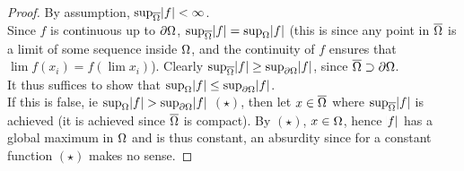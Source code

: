 \begin{proof}
By assumption, $\sup_{\overline{\Omega}} \abs{f} < \infty$.\\

Since $f$ is continuous up to $\partial \Omega$, $\sup_{\overline{\Omega}} \abs{f} = \sup_{\Omega} \abs{f}$ (this is since any point in $\overline{\Omega}$ is a limit of some sequence inside $\Omega$, and the continuity of $f$ ensures that $\lim f(x_i) = f(\lim x_i)$). Clearly $\sup_{\overline{\Omega}} \abs{f} \geq \sup_{\partial \Omega} \abs{f}$, since $\overline{\Omega} \supset \partial \Omega$.\\

It thus suffices to show that $\sup_{\Omega} \abs{f} \leq \sup_{\partial \Omega} \abs{f}$.\\

If this is false, ie $ \sup_{\Omega} \abs{f} > \sup_{\partial \Omega} \abs{f}$ $(\star)$, then let $x \in \overline{\Omega}$ where $\sup_{\overline{ \Omega}} \abs{f} $ is achieved (it is achieved since $\overline{\Omega}$ is compact). By $(\star)$, $x \in \Omega$, hence $\abs{f}$ has a global maximum in $\Omega$ and is thus constant, an absurdity since for a constant function $(\star)$ makes no sense.
\end{proof}















































































